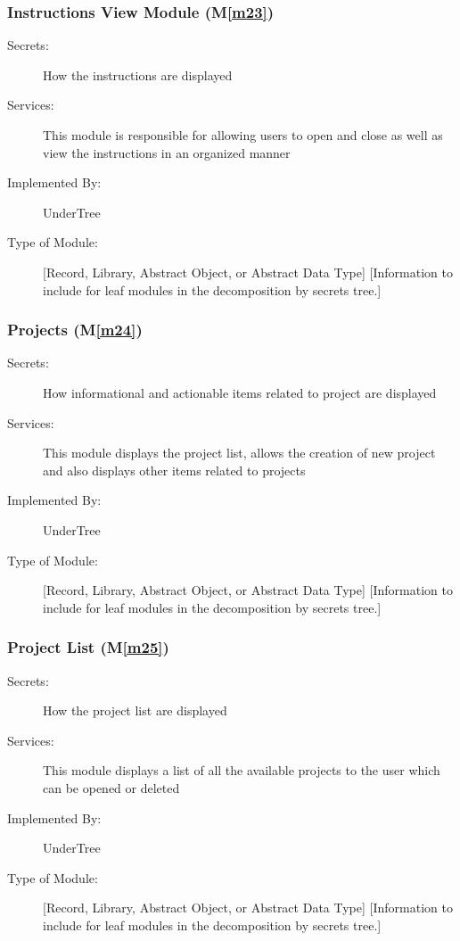 \documentclass[12pt, titlepage]{article}
\newcommand{\mref}[1]{M\ref{#1}}
\begin{document}
	\subsubsection{Instructions View Module (\mref{m23})}
	
	\begin{description}
		\item[Secrets:] How the instructions are displayed
		\item[Services:] This module is responsible for allowing users to open and close as well as view the instructions in an organized manner
		\item[Implemented By:] UnderTree
		\item[Type of Module:] [Record, Library, Abstract Object, or Abstract Data Type]
		[Information to include for leaf modules in the decomposition by secrets tree.]
	\end{description}
	
	\subsubsection{Projects (\mref{m24})}
	
	\begin{description}
		\item[Secrets:] How informational and actionable items related to project are displayed
		\item[Services:] This module displays the project list, allows the creation of new project and also displays other items related to projects
		\item[Implemented By:] UnderTree
		\item[Type of Module:] [Record, Library, Abstract Object, or Abstract Data Type]
		[Information to include for leaf modules in the decomposition by secrets tree.]
	\end{description}
	
	\subsubsection{Project List (\mref{m25})}
	
	\begin{description}
		\item[Secrets:] How the project list are displayed
		\item[Services:] This module displays a list of all the available projects to the user which can be opened or deleted
		\item[Implemented By:] UnderTree
		\item[Type of Module:] [Record, Library, Abstract Object, or Abstract Data Type]
		[Information to include for leaf modules in the decomposition by secrets tree.]
	\end{description}
	
\end{document}
